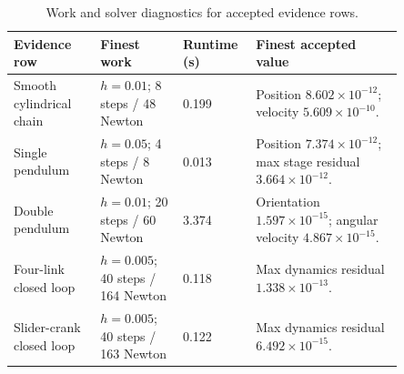\documentclass[preprint,12pt]{elsarticle}
\begin{document}
\begin{table}[htbp]
\centering
\caption{Work and solver diagnostics for accepted evidence rows.}
\label{tab:work-diagnostics}
\scriptsize
\setlength{\tabcolsep}{3pt}
\begin{tabular}{P{0.20\linewidth}P{0.19\linewidth}P{0.12\linewidth}P{0.34\linewidth}}
\toprule
Evidence row & Finest work & Runtime (s) & Finest accepted value \\
\midrule
Smooth cylindrical chain &
$h=0.01$; 8 steps / 48 Newton & 0.199 &
Position $8.602\times10^{-12}$; velocity $5.609\times10^{-10}$. \\
Single pendulum &
$h=0.05$; 4 steps / 8 Newton & 0.013 &
Position $7.374\times10^{-12}$; max stage residual
$3.664\times10^{-12}$. \\
Double pendulum &
$h=0.01$; 20 steps / 60 Newton & 3.374 &
Orientation $1.597\times10^{-15}$; angular velocity
$4.867\times10^{-15}$. \\
Four-link closed loop &
$h=0.005$; 40 steps / 164 Newton & 0.118 &
Max dynamics residual $1.338\times10^{-13}$. \\
Slider-crank closed loop &
$h=0.005$; 40 steps / 163 Newton & 0.122 &
Max dynamics residual $6.492\times10^{-15}$. \\
\bottomrule
\end{tabular}
\end{table}
\end{document}
